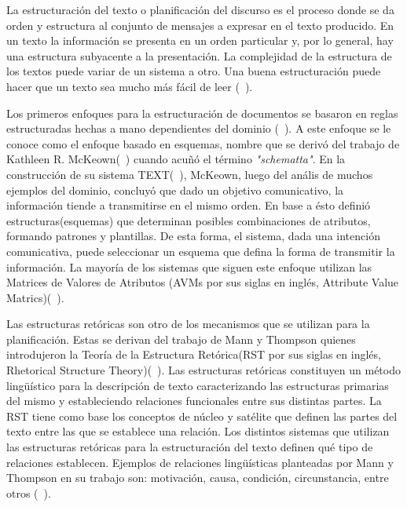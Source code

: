     La estructuración del texto o planificación del discurso es el proceso donde se da orden y estructura al conjunto de mensajes a expresar en el texto producido. En un texto la información se presenta en un orden particular 
y, por lo general, hay una estructura subyacente a la presentación. La complejidad de la estructura de los textos puede variar de un sistema a otro. Una buena estructuración puede hacer que un texto sea mucho más fácil 
de leer (~\cite{Reiter1997BuildingAN}).

    Los primeros enfoques para la estructuración de documentos se basaron en reglas estructuradas hechas a mano dependientes del dominio (~\cite{Gatt2018SurveyOT}). A este enfoque se le conoce como el enfoque basado en esquemas, nombre que 
se deriv\'o del trabajo de Kathleen R. McKeown(~\cite{mckeown1985discourse}) cuando acu\~n\'o el t\'ermino \textit{"schematta"}. En la construcci\'on de su sistema TEXT(~\cite{mckeown1985discourse}), McKeown, luego del an\'alis de muchos 
ejemplos del dominio, concluyó que dado un objetivo comunicativo, la información tiende a transmitirse en el mismo orden. En base a ésto defini\'o estructuras(esquemas) que determinan posibles combinaciones de atributos, formando patrones 
y plantillas. De esta forma, el sistema, dada una intenci\'on comunicativa, puede seleccionar un esquema que defina la forma de transmitir la información. La mayor\'ia de los sistemas que siguen este enfoque utilizan 
las Matrices de Valores de Atributos (AVMs por sus siglas en inglés, Attribute Value Matrics)(~\cite{Perera2017RecentAI}).

    Las estructuras ret\'oricas son otro de los mecanismos que se utilizan para la planificación. Estas se derivan del trabajo de Mann y Thompson quienes introdujeron la Teor\'ia de la Estructura Ret\'orica(RST por
sus siglas en inglés, Rhetorical Structure Theory)(~\cite{mann1988rhetorical}). Las estructuras ret\'oricas constituyen un m\'etodo lingüístico para la descripci\'on de texto caracterizando las estructuras primarias del mismo y estableciendo 
relaciones funcionales entre sus distintas partes. La RST tiene como base los conceptos de n\'ucleo y sat\'elite que definen las partes del texto entre las que se establece una relaci\'on. Los distintos sistemas que utilizan las estructuras ret\'oricas 
para la estructuraci\'on del texto definen qué tipo de relaciones establecen. Ejemplos de relaciones lingüísticas planteadas por Mann y Thompson en su trabajo son: motivaci\'on, causa, condici\'on, circunstancia, entre otros (~\cite{mann1988rhetorical}). 

